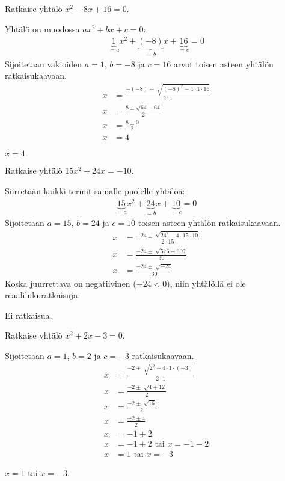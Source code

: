 \begin{esimerkki}
Ratkaise yhtälö $x^2-8x+16=0$.
	\begin{esimratk}
Yhtälö on muodossa $ax^2+bx+c=0$:
\begin{align*}
\underbrace{1}_{=a}x^2 +\underbrace{(-8)}_{=b}x+\underbrace{16}_{=c}=0
\end{align*}
Sijoitetaan vakioiden $a=1$, $b=-8$ ja $c=16$ arvot toisen asteen yhtälön
ratkaisukaavaan.
\begin{align*}
x&=\frac{-(-8)\pm \sqrt[]{(-8)^2-4\cdot 1 \cdot 16}}{2 \cdot 1} \\
x&=\frac{8 \pm \sqrt{64- 64}}{2} \\
x&=\frac{8 \pm 0}{2} \\
x&=4
\end{align*}
	\end{esimratk}
\begin{esimvast}
$x=4$
\end{esimvast}
\end{esimerkki}

\begin{esimerkki}
Ratkaise yhtälö $15x^2+24x=-10$.
\begin{esimratk}
Siirretään kaikki termit samalle puolelle yhtälöä:
\begin{align*}
\underbrace{15}_{=a}x^2+\underbrace{24}_{=b}x+\underbrace{10}_{=c}=0
\end{align*}
Sijoitetaan  $a=15$, $b=24$ ja $c=10$ toisen asteen yhtälön ratkaisukaavaan.
\begin{align*}
x&=\frac{-24 \pm \sqrt[]{24^2-4 \cdot 15 \cdot 10}}{2 \cdot 15} \\
x&=\frac{-24 \pm \sqrt[]{576-600}}{30} \\
x&=\frac{-24 \pm \sqrt[]{-24}}{30}
\end{align*}
Koska juurrettava on negatiivinen ($-24<0$), niin yhtälöllä ei ole reaalilukuratkaisuja.
\end{esimratk}
\begin{esimvast}
Ei ratkaisua.
\end{esimvast}
\end{esimerkki}

\begin{esimerkki}
Ratkaise yhtälö $x^2+2x-3=0$.
\begin{esimratk}
Sijoitetaan  $a=1$, $b=2$ ja $c=-3$ ratkaisukaavaan.
\begin{align*}
x&=\frac{-2 \pm \sqrt[]{2^2-4 \cdot 1 \cdot (-3)}}{2 \cdot 1} \\
x&=\frac{-2 \pm \sqrt[]{4+12}}{2} \\
x&=\frac{-2 \pm \sqrt[]{16}}{2} \\
x&=\frac{-2 \pm 4}{2} \\
x&=-1 \pm 2 \\
x&= -1+2 \text{ tai } x = -1-2 \\
x&=1 \text{ tai } x=-3 
\end{align*}
\end{esimratk}
\begin{esimvast}
$x=1$ tai $x=-3$.
\end{esimvast}
\end{esimerkki}

